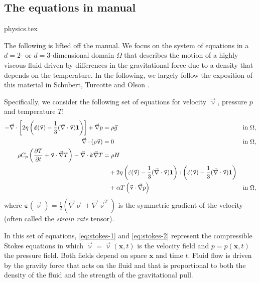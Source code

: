\subsection{The equations in \aspect manual}
\begin{flushright} {\tiny {\color{gray} physics.tex}} \end{flushright}

The following is lifted off the \aspect manual.
We focus on the system of equations in a $d=2$- or $d=3$-dimensional
domain $\Omega$ that describes the motion of a highly viscous fluid driven
by differences in the gravitational force due to a density that depends on
the temperature. In the following, we largely follow the exposition of this
material in Schubert, Turcotte and Olson \cite{scto01}.

Specifically, we consider the following set of equations for velocity $\vec\upnu$, pressure $p$ and temperature $T$:
\begin{align}
  \label{eq:stokes-1}
  -\vec\nabla \cdot \left[2\eta \left(\dot{\bm \varepsilon}(\vec \upnu)
                                  - \frac{1}{3}(\vec\nabla \cdot \vec \upnu)\mathbf 1\right)
                \right] + \vec\nabla p &=
  \rho \vec g
  &
  & \textrm{in $\Omega$},
  \\
  \label{eq:stokes-2}
  \vec\nabla \cdot (\rho \vec \upnu) &= 0
  &
  & \textrm{in $\Omega$},
  \\
  \label{eq:temperature}
  \rho C_p \left(\frac{\partial T}{\partial t} + \vec \upnu\cdot\vec\nabla T\right)
  - \vec\nabla\cdot k\vec\nabla T
  &=
  \rho H
  \notag
  \\
  &\quad
  +
  2\eta
  \left(\dot\varepsilon(\vec\upnu) - \frac{1}{3}(\vec\nabla \cdot \vec \upnu)\mathbf 1\right)
  :
  \left(\dot\varepsilon(\vec\upnu) - \frac{1}{3}(\vec\nabla \cdot \vec \upnu)\mathbf 1\right)
  \\
  &\quad
  +\alpha T \left( \vec \upnu \cdot \vec\nabla p \right)
  && \textrm{in $\Omega$},
  \notag
\end{align}
where $\dot{\bm \varepsilon}(\vec\upnu) = \frac{1}{2}(\vec\nabla \vec\upnu + \vec\nabla \vec\upnu^T)$ 
is the symmetric gradient of the velocity (often called the
\textit{strain rate} tensor).

In this set of equations, \eqref{eq:stokes-1} and \eqref{eq:stokes-2}
represent the compressible Stokes equations in which $\vec\upnu =\vec\upnu (\mathbf x,t)$ 
is the velocity field and $p=p(\mathbf x,t)$ the pressure
field. Both fields depend on space $\mathbf x$ and time $t$. Fluid flow is
driven by the gravity force that acts on the fluid and that is proportional to
both the density of the fluid and the strength of the gravitational pull.


